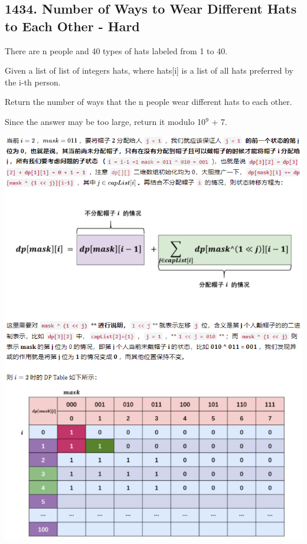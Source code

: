 \documentclass[9pt, b5paper]{article}
\begin{document}
\subsection{1434. Number of Ways to Wear Different Hats to Each Other - Hard}
\label{sec-3-10}
There are n people and 40 types of hats labeled from 1 to 40.

Given a list of list of integers hats, where hats[i] is a list of all hats preferred by the i-th person.

Return the number of ways that the n people wear different hats to each other.

Since the answer may be too large, return it modulo 10$^{\text{9}}$ + 7.

\includegraphics[width=.9\linewidth]{./pic/hats.png}
\end{document}
